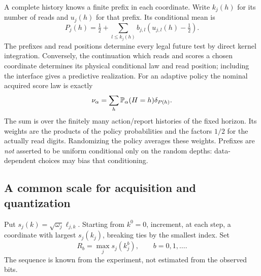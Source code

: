 A complete history knows a finite prefix in each coordinate. Write $k_j(h)$ for its number of reads and $u_j(h)$ for that prefix. Its conditional mean is
\begin{equation}\label{eq:actualcenter}
 P_j(h)=\tfrac12+\sum_{l\le k_j(h)}b_{j,l}(u_{j,l}(h)-\tfrac12).
\end{equation}
The prefixes and read positions determine every legal future test by direct kernel integration. Conversely, the continuation which reads and scores a chosen coordinate determines its physical conditional law and read position; including the interface gives a predictive realization. For an adaptive policy the nominal acquired score law is exactly
\begin{equation}\label{eq:adaptiveactual}
 \nu_\alpha=\sum_{h}\mathbb P_\alpha(H=h)\delta_{P(h)}.
\end{equation}
The sum is over the finitely many action/report histories of the fixed horizon. Its weights are the products of the policy probabilities and the factors $1/2$ for the actually read digits. Randomizing the policy averages these weights. Prefixes are \emph{not} asserted to be uniform conditional only on the random depths: data-dependent choices may bias that conditioning.

\subsection{A common scale for acquisition and quantization}
Put $s_j(k)=\sqrt{\omega_j}\ell_{j,k}$. Starting from $k^0=0$, increment, at each step, a coordinate with largest $s_j(k_j)$, breaking ties by the smallest index. Set
\begin{equation}\label{eq:greedy}
 R_b=\max_j s_j(k_j^b),\qquad b=0,1,\ldots.
\end{equation}
The sequence is known from the experiment, not estimated from the observed bits.

